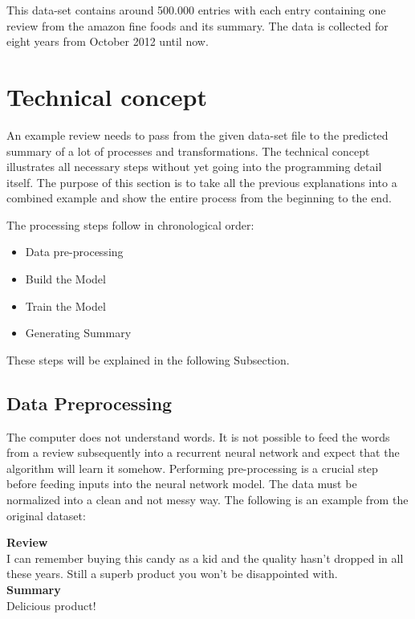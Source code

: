 This data-set contains around 500.000 entries with each entry containing one review from the amazon fine foods and its summary. The data is collected for eight years from October 2012 until now. 

\section{Technical concept}\label{ss:tc}

An example review needs to pass from the given data-set file to the predicted summary of a lot of processes and transformations. The technical concept illustrates all necessary steps without yet going into the programming detail itself. The purpose of this section is to take all the previous explanations into a combined example and show the entire process from the beginning to the end. 

The processing steps follow in chronological order:

\begin{itemize}
	\item Data pre-processing
	\item Build the Model
	\item Train the Model
	\item Generating Summary
\end{itemize}

These steps will be explained in the following Subsection.

\subsection{Data Preprocessing}\label{ss:preprop}

The computer does not understand words. It is not possible to feed the words from a review subsequently into a recurrent neural network and expect that the algorithm will learn it somehow. Performing pre-processing is a crucial step before feeding inputs into the neural network model. The data must be normalized into a clean and not messy way. The following is an example from the original dataset:

\begin{tcolorbox}
	\textbf{Review} \\
	I can remember buying this candy as a kid and the quality hasn't dropped in all these years. Still a superb product you won't be disappointed with. \\
	
	\textbf{Summary} \\
	Delicious product!
\end{tcolorbox}

